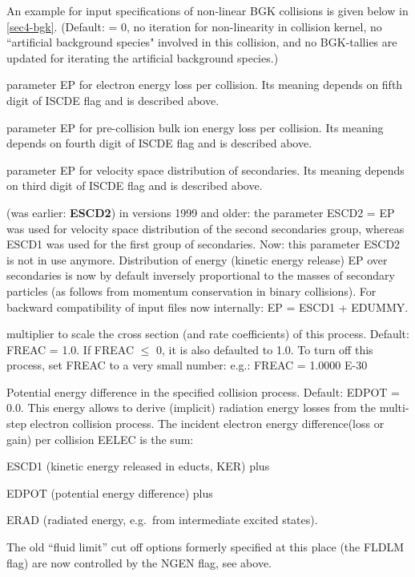 \begin{description}
        An example for input specifications of non-linear \ac{BGK} collisions is given
        below in \cref{sec4-bgk}.
        (Default: = 0, no iteration for non-linearity in collision kernel, no
        ``artificial background species" involved in this collision, and no
        \acs{BGK}-tallies are updated for iterating the artificial background species.)
  \item[EELEC] parameter EP for electron energy loss per collision.
        Its meaning depends on fifth digit of ISCDE flag and is described above.
  \item[EBULK] parameter EP for pre-collision bulk ion energy loss per collision.
        Its meaning depends on fourth digit of ISCDE flag and is described above.
  \item[ESCD1] parameter EP for velocity space distribution of secondaries.
        Its meaning depends on third digit of ISCDE flag and is described above.
  \item[EDUMMY] (was earlier: \textbf{ESCD2}) in versions 1999 and older: the
        parameter ESCD2 = EP was used for velocity space distribution of the second
        secondaries group, whereas ESCD1 was used for the first group of secondaries.
        Now: this parameter ESCD2 is not in use anymore.
        Distribution of energy (kinetic energy release) EP over secondaries is now by
        default inversely proportional to the masses of secondary particles (as follows
        from momentum conservation in binary collisions).
        For backward compatibility of input files now internally: EP = ESCD1 + EDUMMY.
  \item[FREAC] multiplier to scale the cross section (and rate coefficients) of
        this process.
        Default: FREAC = 1.0.
        If FREAC $\leq$ 0, it is also defaulted to 1.0.
        To turn off this process, set FREAC to a very small number: e.g.: FREAC =
        1.0000 E-30
  \item[EDPOT] Potential energy difference in the specified collision
        process.
        Default: EDPOT = 0.0.
        This energy allows to derive (implicit) radiation energy losses from the
        multi-step electron collision process.
        The incident electron energy difference(loss or gain) per collision EELEC is
        the sum:

        ESCD1 (kinetic energy released in educts, KER) plus

        EDPOT (potential energy difference) plus

        ERAD (radiated energy, e.g.\ from intermediate excited states).

        The old ``fluid limit'' cut off options formerly specified at this place (the
        FLDLM flag) are now controlled by the NGEN flag, see above.

\end{description}

